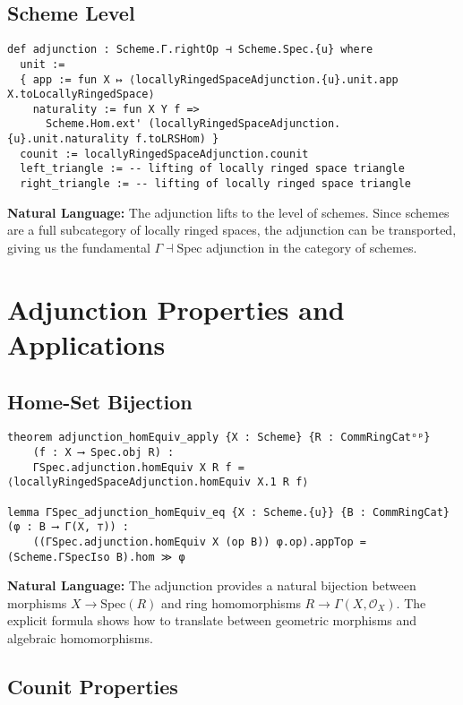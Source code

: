 \documentclass{article}
\theoremstyle{definition}
\begin{document}
{\subsection{Scheme Level}

\begin{lstlisting}
def adjunction : Scheme.Γ.rightOp ⊣ Scheme.Spec.{u} where
  unit := 
  { app := fun X ↦ ⟨locallyRingedSpaceAdjunction.{u}.unit.app X.toLocallyRingedSpace⟩
    naturality := fun X Y f => 
      Scheme.Hom.ext' (locallyRingedSpaceAdjunction.{u}.unit.naturality f.toLRSHom) }
  counit := locallyRingedSpaceAdjunction.counit
  left_triangle := -- lifting of locally ringed space triangle
  right_triangle := -- lifting of locally ringed space triangle
\end{lstlisting}

\textbf{Natural Language:} The adjunction lifts to the level of schemes. Since schemes are a full subcategory of locally ringed spaces, the adjunction can be transported, giving us the fundamental $\Gamma \dashv \mathrm{Spec}$ adjunction in the category of schemes.

\section{Adjunction Properties and Applications}

\subsection{Home-Set Bijection}

\begin{lstlisting}
theorem adjunction_homEquiv_apply {X : Scheme} {R : CommRingCatᵒᵖ}
    (f : X ⟶ Spec.obj R) :
    ΓSpec.adjunction.homEquiv X R f = ⟨locallyRingedSpaceAdjunction.homEquiv X.1 R f⟩

lemma ΓSpec_adjunction_homEquiv_eq {X : Scheme.{u}} {B : CommRingCat} (φ : B ⟶ Γ(X, ⊤)) :
    ((ΓSpec.adjunction.homEquiv X (op B)) φ.op).appTop = (Scheme.ΓSpecIso B).hom ≫ φ
\end{lstlisting}

\textbf{Natural Language:} The adjunction provides a natural bijection between morphisms $X \to \mathrm{Spec}(R)$ and ring homomorphisms $R \to \Gamma(X, \mathcal{O}_X)$. The explicit formula shows how to translate between geometric morphisms and algebraic homomorphisms.

\subsection{Counit Properties}

}
\end{document}
